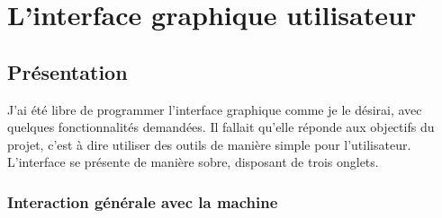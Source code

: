 \section{L'interface graphique utilisateur}


\subsection{Présentation}

J'ai été libre de programmer l'interface graphique comme je le désirai, avec quelques fonctionnalités demandées.
Il fallait qu'elle réponde aux objectifs du projet, c'est à dire utiliser des outils de manière simple pour l'utilisateur.
\\


L'interface se présente de manière sobre, disposant de trois onglets.
\\




\subsubsection{Interaction générale avec la machine}

